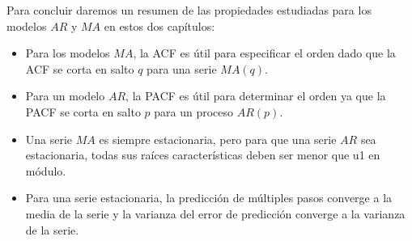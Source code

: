 \documentclass[12pt,]{krantz}
\theoremstyle{definition}
\theoremstyle{definition}
\theoremstyle{definition}
\theoremstyle{remark}
\begin{document}
Para concluir daremos un resumen de las propiedades estudiadas para los
modelos \(AR\) y \(MA\) en estos dos capítulos:

\begin{itemize}
\item
  Para los modelos \(MA\), la ACF es útil para especificar el orden dado
  que la ACF se corta en salto \(q\) para una serie \(MA(q)\).
\item
  Para un modelo \(AR\), la PACF es útil para determinar el orden ya que
  la PACF se corta en salto \(p\) para un proceso \(AR(p)\).
\item
  Una serie \(MA\) es siempre estacionaria, pero para que una serie
  \(AR\) sea estacionaria, todas sus raíces características deben ser
  menor que u1 en módulo.
\item
  Para una serie estacionaria, la predicción de múltiples pasos converge
  a la media de la serie y la varianza del error de predicción converge
  a la varianza de la serie.
\end{itemize}

\cleardoublepage 

\appendix {}




\backmatter
\printindex
\end{document}
